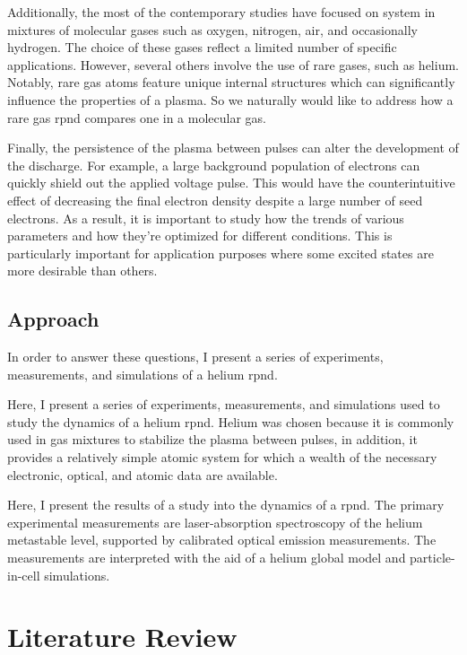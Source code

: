 Additionally, the most of the contemporary studies have focused on system in
mixtures of molecular gases such as oxygen, nitrogen, air, and occasionally
hydrogen. The choice of these gases reflect a limited number of specific
applications. However, several others involve the use of rare gases, such as
helium. Notably, rare gas atoms feature unique internal structures which can
significantly influence the properties of a plasma. So we naturally would like
to address how a rare gas \acs{rpnd} compares one in a molecular gas.

Finally, the persistence of the plasma between pulses can alter the development
of the discharge. For example, a large background population of electrons can
quickly shield out the applied voltage pulse. This would have the
counterintuitive effect of decreasing the final electron density despite a large
number of seed electrons. As a result, it is important to study how the trends
of various parameters and how they're optimized for different conditions. This
is particularly important for application purposes where some excited states are
more desirable than others.

\subsection{Approach}

In order to answer these questions, I present a series of experiments,
measurements, and simulations of a helium \acs{rpnd}.

Here, I present a series of experiments, measurements, and simulations used to
study the dynamics of a helium \acs{rpnd}. Helium was chosen because it is
commonly used in gas mixtures to stabilize the plasma between pulses, in
addition, it provides a relatively simple atomic system for which a wealth of
the necessary electronic, optical, and atomic data are available.




Here, I present the results of a study into the dynamics of a \acs{rpnd}. The
primary experimental measurements are laser-absorption spectroscopy of the
helium metastable level, supported by calibrated optical emission measurements.
The measurements are interpreted with the aid of a helium global model and
particle-in-cell simulations.

\section{Literature Review}

